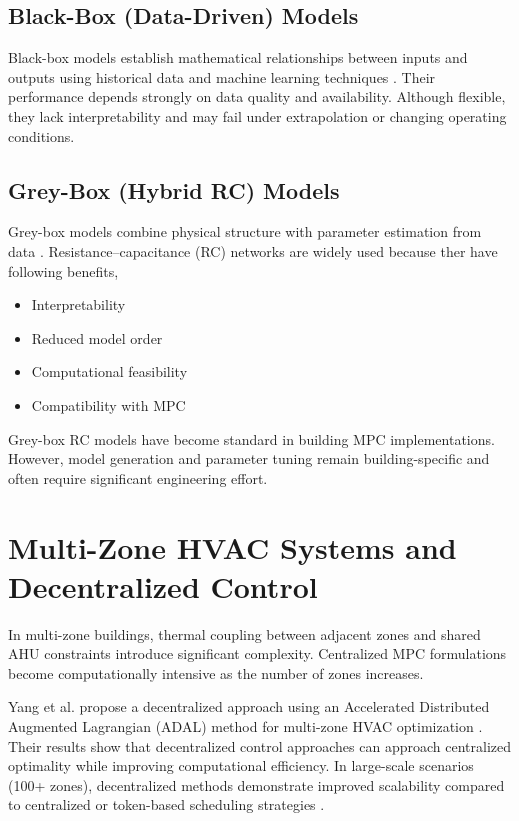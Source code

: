\documentclass[twocolumn,11pt,a4paper]{article}
\begin{document}
\subsection{Black-Box (Data-Driven) Models}
Black-box models establish mathematical relationships between inputs and outputs using historical data and machine learning techniques \cite{aframTheoryApplicationsHVAC2014}. Their performance depends strongly on data quality and availability. Although flexible, they lack interpretability and may fail under extrapolation or changing operating conditions.

\subsection{Grey-Box (Hybrid RC) Models}
Grey-box models combine physical structure with parameter estimation from data \cite{aframTheoryApplicationsHVAC2014}. Resistance–capacitance (RC) networks are widely used because ther have following benefits,
\begin{itemize}
    \item Interpretability
    \item Reduced model order
    \item Computational feasibility
    \item Compatibility with MPC
\end{itemize}

Grey-box RC models have become standard in building MPC implementations. However, model generation and parameter tuning remain building-specific and often require significant engineering effort.

\section{Multi-Zone HVAC Systems and Decentralized Control}
In multi-zone buildings, thermal coupling between adjacent zones and shared AHU constraints introduce significant complexity. Centralized MPC formulations become computationally intensive as the number of zones increases.

Yang et al. propose a decentralized approach using an Accelerated Distributed Augmented Lagrangian (ADAL) method for multi-zone HVAC optimization \cite{yangHVACEnergyCost2019}. Their results show that decentralized control approaches can approach centralized optimality while improving computational efficiency. In large-scale scenarios (100+ zones), decentralized methods demonstrate improved scalability compared to centralized or token-based scheduling strategies \cite{yangHVACEnergyCost2019}.
\end{document}
